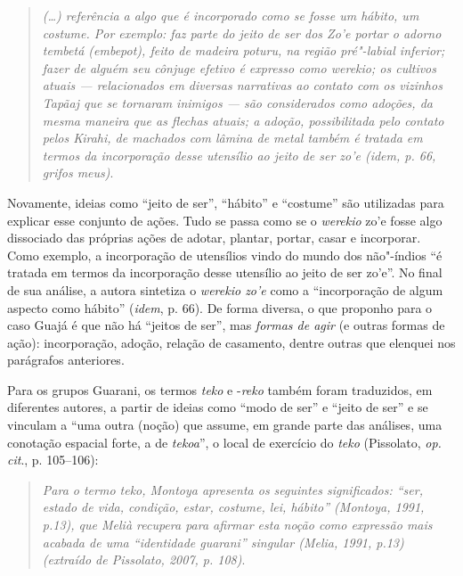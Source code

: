 \begin{quote}
\emph{(\ldots{}) referência a algo que é incorporado como se fosse um hábito,
um costume. Por exemplo: faz parte do \emph{jeito de ser dos Zo'e}
portar o adorno tembetá (\emph{embepot}), feito de madeira poturu, na
região pré"-labial inferior; fazer de alguém seu cônjuge efetivo é
expresso como \emph{werekio}; os cultivos atuais --- relacionados em
diversas narrativas ao contato com os vizinhos \emph{Tapãaj} que se
tornaram inimigos --- são considerados como adoções, da mesma maneira que
as flechas atuais; a adoção, possibilitada pelo contato pelos
\emph{Kirahi}, de machados com lâmina de metal também é tratada em
termos da incorporação desse utensílio ao jeito de ser zo'e (\emph{idem}, p.
66, grifos meus)}.
\end{quote}

Novamente, ideias como ``jeito de ser'', ``hábito'' e ``costume'' são
utilizadas para explicar esse conjunto de ações. Tudo se passa como se o
\emph{werekio} zo'e fosse algo dissociado das próprias ações de adotar,
plantar, portar, casar e incorporar. Como exemplo, a incorporação de
utensílios vindo do mundo dos não"-índios ``é tratada em termos da
incorporação desse utensílio ao jeito de ser zo'e''. No final de sua
análise, a autora sintetiza o \emph{werekio zo'e} como a ``incorporação
de algum aspecto como hábito'' (\emph{idem}, p. 66). De forma diversa, o que
proponho para o caso Guajá é que não há ``jeitos de ser'', mas
\emph{formas de agir} (e outras formas de ação): incorporação, adoção,
relação de casamento, dentre outras que elenquei nos parágrafos
anteriores.

Para os grupos Guarani, os termos \emph{teko} e -\emph{reko} também
foram traduzidos, em diferentes autores, a partir de ideias como ``modo
de ser'' e ``jeito de ser'' e se vinculam a ``uma outra (noção) que assume,
em grande parte das análises, uma conotação espacial forte, a de
\emph{tekoa}'', o local de exercício do \emph{teko} (Pissolato, \emph{op. cit}.,
p. 105--106):

\begin{quote}
\emph{Para o termo \emph{teko}, Montoya apresenta os seguintes significados:
``ser, estado de vida, condição, estar, costume, lei, hábito'' (Montoya,
1991, p.13), que Melià recupera para afirmar esta noção como expressão
mais acabada de uma ``identidade guarani'' singular (Melia, 1991, p.13)
(extraído de Pissolato, 2007, p. 108)}.
\end{quote}

